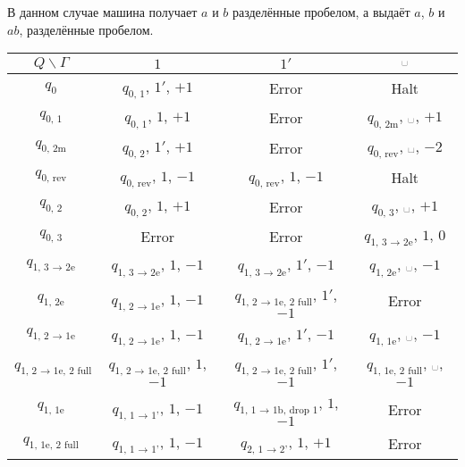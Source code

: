 \documentclass[12pt,a4paper]{article}
\newcommand{\spacesymbol}{\ensuremath{\text{\textvisiblespace}}}
\begin{document}
    \begin{enumproblem}
        В данном случае машина получает $a$ и $b$ разделённые пробелом, а выдаёт $a$, $b$ и $ab$, разделённые пробелом.
        \begin{table}[H]
            \centering
            \begin{tabular}{c||c|c|c}
                $Q\backslash\Gamma$& $1$& $1'$& $\spacesymbol$\\
                \hline
                \hline
                $q_0$& $q_{\text{0, 1}}$, $1'$, $+1$& Error& Halt\\
                \hline
                $q_{\text{0, 1}}$& $q_{\text{0, 1}}$, $1$, $+1$& Error& $q_{\text{0, 2m}}$, \spacesymbol, $+1$\\
                \hline
                $q_{\text{0, 2m}}$& $q_{\text{0, 2}}$, $1'$, $+1$& Error& $q_{\text{0, rev}}$, \spacesymbol, $-2$\\
                \hline
                $q_{\text{0, rev}}$& $q_{\text{0, rev}}$, $1$, $-1$& $q_{\text{0, rev}}$, $1$, $-1$& Halt\\
                \hline
                $q_{\text{0, 2}}$& $q_{\text{0, 2}}$, $1$, $+1$& Error& $q_{\text{0, 3}}$, \spacesymbol, $+1$\\
                \hline
                $q_{\text{0, 3}}$& Error& Error& $q_{\text{1, 3 $\to$ 2e}}$, $1$, $0$\\
                \hline
                $q_{\text{1, 3 $\to$ 2e}}$& $q_{\text{1, 3 $\to$ 2e}}$, $1$, $-1$& $q_{\text{1, 3 $\to$ 2e}}$, $1'$, $-1$& $q_{\text{1, 2e}}$, \spacesymbol, $-1$\\
                \hline
                $q_{\text{1, 2e}}$& $q_{\text{1, 2 $\to$ 1e}}$, $1$, $-1$& $q_{\text{1, 2 $\to$ 1e, 2 full}}$, $1'$, $-1$& Error\\
                \hline
                $q_{\text{1, 2 $\to$ 1e}}$& $q_{\text{1, 2 $\to$ 1e}}$, $1$, $-1$& $q_{\text{1, 2 $\to$ 1e}}$, $1'$, $-1$& $q_{\text{1, 1e}}$, \spacesymbol, $-1$\\
                \hline
                $q_{\text{1, 2 $\to$ 1e, 2 full}}$& $q_{\text{1, 2 $\to$ 1e, 2 full}}$, $1$, $-1$& $q_{\text{1, 2 $\to$ 1e, 2 full}}$, $1'$, $-1$& $q_{\text{1, 1e, 2 full}}$, \spacesymbol, $-1$\\
                \hline
                $q_{\text{1, 1e}}$& $q_{\text{1, 1 $\to$ 1'}}$, $1$, $-1$& $q_{\text{1, 1 $\to$ 1b, drop 1}}$, $1$, $-1$& Error\\
                \hline
                $q_{\text{1, 1e, 2 full}}$& $q_{\text{1, 1 $\to$ 1'}}$, $1$, $-1$& $q_{\text{2, 1 $\to$ 2'}}$, $1$, $+1$& Error\\

\end{tabular}
\end{table}
\end{enumproblem}
\end{document}
